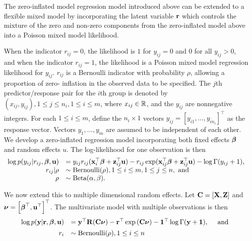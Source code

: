 The zero-inflated model regression model introduced above can be extended to a
flexible mixed model by incorporating the latent variable ${\bf r}$ which controls
the mixture of the zero and non-zero components from the zero-inflated model
above into a Poisson mixed model likelihood.

When the indicator $r_{ij} = 0$, the likelihood is $1$ for $y_{ij} = 0$ and $0$
for all $y_{ij} > 0$, and when the indicator $r_{ij} = 1$, the likelihood is a
Poisson mixed model regression likelihood for $y_{ij}$.  $r_{ij}$ is a
Bernoulli indicator with probability $\rho$, allowing a proportion of zero-
inflation in the observed data to be specified. The $j$th predictor/response
pair for the $i$th group is denoted by $(x_{ij}, y_{ij}), 1 \leq j \leq n_i, 1
\leq i \leq m$, where $x_{ij} \in {\mathbb{R}}$, and the $y_{ij}$ are nonnegative
integers. For each $1 \leq i \leq m$, define the $n_i \times 1$ vectors $y_{ij}
= [y_{i 1}, \ldots, y_{i n_i}]^\top$ as the response vector. Vectors $y_1,
\ldots, y_m$ are assumed to be independent of each other.  We develop a
zero-inflated regression model incorporating both fixed effects ${\boldsymbol \beta}$ and
random effects $u$. The log-likelihood for one observation is then
\begin{equation*}
	\begin{array}{rl}
		\log p(y_{ij} | r_{ij}, {\boldsymbol \beta}, {\bf u}) & = y_{ij} r_{ij} ({\bf x}_i^\top {\boldsymbol\beta} + {\bf z}_{ij}^\top {\bf u}) - r_{ij} \exp ({\bf x}_{ij}^\top {\boldsymbol\beta} + {\bf z}_{ij}^\top {\bf u}) - \log \Gamma (y_{ij} + 1), \\
		r_{ij} | \rho                  & \sim \text{Bernoulli}(\rho), 1 \leq i \leq m, 1 \leq j \leq n, \text{ and }                                                              \\
		\rho                        & \sim \text{Beta}(\alpha, \beta).                                                                                              \\
	\end{array}
\end{equation*}

\noindent We now extend this to multiple dimensional random effects. Let ${\bf C} =
[{\bf X}, {\bf Z}]$ and ${\boldsymbol \nu} = \left[ {\boldsymbol \beta}^\top, {\bf u}^\top \right]^\top$. The
multivariate model with multiple observations is then 
\begin{equation*}
    \begin{array}{rl} \log{p({\bf y}|{\bf r}, {\boldsymbol\beta}, {\bf u})} &= {\bf y}^\top {\bf R} ({\bf C}{\boldsymbol \nu})
        - {\bf r}^\top \exp{({\bf C}{\boldsymbol\nu})} - {\bf 1}^\top \log{\Gamma{({\bf y}+ {\bf1})}},
        \quad \mbox{ and } \\
        [1ex] r_i& \sim \text{Bernoulli}(\rho), 1 \leq i \leq n \\ 
    \end{array} 
\end{equation*}

